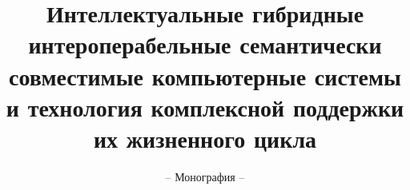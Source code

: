 \documentclass[graybox,envcountchap,sectrefs]{svmono}
\begin{document}
\author{}
\title{Интеллектуальные гибридные интероперабельные семантически совместимые компьютерные системы и технология комплексной поддержки их жизненного цикла}
\subtitle{-- Монография --}
\maketitle

\frontmatter%



\tableofcontents



\mainmatter%









\backmatter%

\printindex

\end{document}
